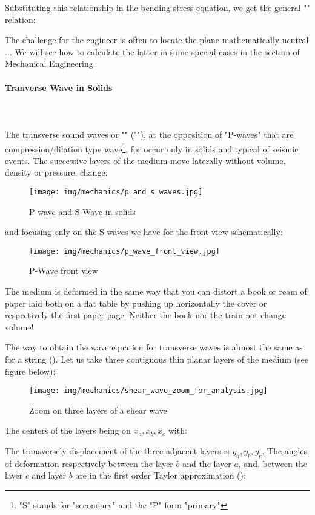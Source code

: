 	Substituting this relationship in the bending stress equation, we get the general "" relation:
	
	The challenge for the engineer is often to locate the plane mathematically neutral ... We will see how to calculate the latter in some special cases in the section of Mechanical Engineering.
	
	\pagebreak
	\paragraph{Tranverse Wave in Solids}\mbox{}\\\\
	The transverse sound waves or "" (""), at the opposition of "P-waves" that are compression/dilation type wave\footnote{"S" stands for "secondary" and the "P" form "primary"}, for occur only in solids and typical of seismic events. The successive layers of the medium move laterally without volume, density or pressure, change:
	\begin{figure}[H]
		\centering
		\texttt{[image: img/mechanics/p\_and\_s\_waves.jpg]}
		\caption{P-wave and S-Wave in solids}
	\end{figure}
	and focusing only on the S-waves we have for the front view schematically:
	\begin{figure}[H]
		\centering
		\texttt{[image: img/mechanics/p\_wave\_front\_view.jpg]}
		\caption{P-Wave front view}
	\end{figure}
	The medium is deformed in the same way that you can distort a book or ream of paper laid both on a flat table by pushing up horizontally the cover or respectively the first paper page. Neither the book nor the train not change volume!

	The way to obtain the wave equation for transverse waves is almost the same as for a string (). Let us take three contiguous thin planar layers of the medium (see figure below):
	\begin{figure}[H]
		\centering
		\texttt{[image: img/mechanics/shear\_wave\_zoom\_for\_analysis.jpg]}
		\caption{Zoom on three layers of a shear wave}
	\end{figure}
	The centers of the layers being on $x_a,x_b,x_c$ with:
	
	The transversely displacement of the three adjacent layers is $y_a,y_b,y_c$. The angles of deformation respectively between the layer $b$ and the layer $a$, and, between the layer $c$ and layer $b$ are in the first order Taylor approximation ():
	
